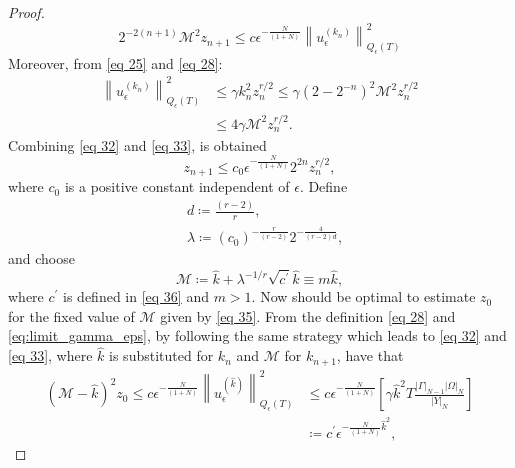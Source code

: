 \begin{proof}
\begin{equation}
    2^{-2(n+1)} \mathcal{M}^{2} z_{n+1} \leq c \epsilon^{-\frac{N}{(1+N)}}\left\|u_{\epsilon}^{\left(k_{n}\right)}\right\|_{Q_{\epsilon}(T)}^{2}
\label{eq 32}
\end{equation}
Moreover, from \eqref{eq 25} and \eqref{eq 28}:
\begin{equation}
    \begin{aligned}
        \left\|u_{\epsilon}^{\left(k_{n}\right)}\right\|_{Q_{\epsilon}(T)}^{2} & \leq \gamma k_{n}^{2} z_{n}^{r / 2} \leq \gamma\left(2-2^{-n}\right)^{2} \mathcal{M}^{2} z_{n}^{r / 2} \\
        & \leq 4 \gamma \mathcal{M}^{2} z_{n}^{r / 2}.
    \end{aligned}
\label{eq 33}\end{equation}
Combining \eqref{eq 32} and \eqref{eq 33}, is obtained
\begin{equation}
    z_{n+1} \leq c_{0} \epsilon^{-\frac{N}{(1+N)}} 2^{2 n} z_{n}^{r / 2},
\label{eq 34}
\end{equation}
where $c_{0}$ is a positive constant independent of $\epsilon$.
Define
$$
    \begin{aligned}
        &d\coloneqq \frac{(r-2)}{r}, \\
        &\lambda\coloneqq \left(c_{0}\right)^{-\frac{r}{(r-2)}} 2^{-\frac{4}{(r-2) d}},
    \end{aligned}
$$
and choose
\begin{equation}
  \mathcal{M}\coloneqq \hat{k}+\lambda^{-1 / r} \sqrt{c^{\prime}} \hat{k} \equiv m \hat{k},
\label{eq 35}\end{equation}
where $c^{\prime}$ is defined in \eqref{eq 36} and $m>1$. Now should be optimal to estimate $z_{0}$ for the fixed value of $\mathcal{M}$ given by \eqref{eq 35}. From the definition \eqref{eq 28} and \eqref{eq:limit_gamma_eps}, by following the same strategy which leads to \eqref{eq 32} and \eqref{eq 33}, where $\hat{k}$ is substituted for $k_{n}$ and $\mathcal{M}$ for $k_{n+1}$, have that
\begin{equation}
    \begin{aligned}
        (\mathcal{M}-\hat{k})^{2} z_{0} \leq c \epsilon^{-\frac{N}{(1+N)}}\left\|u_{\epsilon}^{(\hat{k})}\right\|_{Q_{\epsilon}(T)}^{2} & \leq c \epsilon^{-\frac{N}{(1+N)}}\left[\gamma \hat{k}^{2} T \frac{|\Gamma|_{N-1}|\Omega|_{N}}{|Y|_{N}}\right] \\
        &\coloneqq c^{\prime} \epsilon^{-\frac{N}{(1+N)} \hat{k}^{2}},
    \end{aligned}

\end{equation}
\end{proof}
